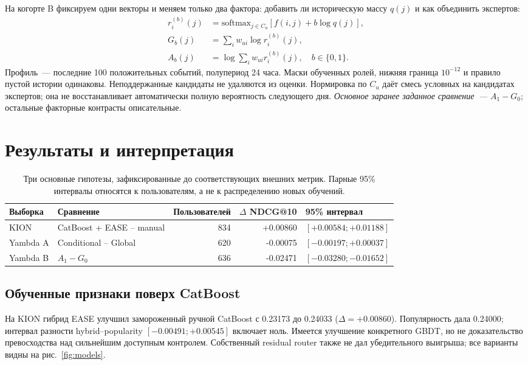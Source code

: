 \documentclass[10pt,a4paper,twocolumn]{article}
\newcommand{\KionDelta}{+0.00860}
\newcommand{\KionPopLow}{-0.00491}
\newcommand{\KionPopHigh}{+0.00545}
\begin{document}
На когорте B фиксируем одни векторы и меняем только два фактора:
добавить ли историческую массу $q(j)$ и как объединить экспертов:
\begin{align}
 r_i^{(b)}(j)&=\mathrm{softmax}_{j\in C_u}[f(i,j)+b\log q(j)],\nonumber\\
 G_b(j)&=\sum_i w_{ui}\log r_i^{(b)}(j),\nonumber\\
 A_b(j)&=\log\sum_i w_{ui}r_i^{(b)}(j),\quad b\in\{0,1\}.
 \label{eq:factorial}
\end{align}
Профиль~--- последние 100 положительных событий, полупериод 24 часа.
Маски обученных ролей, нижняя граница $10^{-12}$ и правило пустой истории одинаковы.
Неподдержанные кандидаты не удаляются из оценки.
Нормировка по $C_u$ даёт смесь условных на кандидатах экспертов;
она не восстанавливает автоматически полную вероятность следующего дня.
\emph{Основное заранее заданное сравнение~--- $A_1-G_0$};
остальные факторные контрасты описательные.



\section{Результаты и интерпретация}

\begin{table}[t]
\centering\small
\caption{Три основные гипотезы, зафиксированные до соответствующих внешних метрик.
Парные 95\% интервалы относятся к пользователям, а не к распределению новых обучений.}
\label{tab:primary}
\begin{tabular}{@{}llrrl@{}}\toprule
Выборка & Сравнение & Пользователей & $\Delta$ NDCG@10 & 95\% интервал\\\midrule
KION & CatBoost + EASE -- manual & 834 & +0.00860 & $[+0.00584;+0.01188]$ \\
Yambda A & Conditional -- Global & 620 & -0.00075 & $[-0.00197;+0.00037]$ \\
Yambda B & $A_1-G_0$ & 636 & -0.02471 & $[-0.03280;-0.01652]$ \\
\bottomrule\end{tabular}
\end{table}

\subsection{Обученные признаки поверх CatBoost}
На KION гибрид EASE улучшил замороженный ручной CatBoost
с 0.23173 до 0.24033 ($\Delta=\KionDelta$).
Популярность дала 0.24000; интервал разности hybrid--popularity
$[\KionPopLow;\allowbreak\KionPopHigh]$ включает ноль.
Имеется улучшение конкретного GBDT, но не доказательство превосходства
над сильнейшим доступным контролем. Собственный residual router
также не дал убедительного выигрыша; все варианты видны на рис.~\ref{fig:models}.
\end{document}
